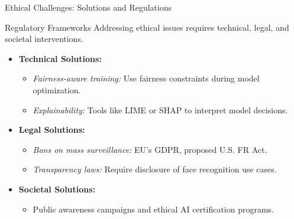 \documentclass[pdfpagelabels=false, usepdftitle=false, aspectratio=169]{beamer}
\begin{document}
\begin{frame}{Ethical Challenges: Solutions and Regulations}
\scriptsize
\begin{block}{{Regulatory Frameworks}}
    Addressing ethical issues requires technical, legal, and societal interventions.
\end{block}
\begin{itemize}
    \item \textbf{Technical Solutions:}
    \begin{itemize}
        \item \textit{Fairness-aware training:} Use fairness constraints during model optimization.
        \item \textit{Explainability:} Tools like LIME or SHAP to interpret model decisions.
    \end{itemize}
    \item \textbf{Legal Solutions:}
    \begin{itemize}
        \item \textit{Bans on mass surveillance:} EU's GDPR, proposed U.S. FR Act.
        \item \textit{Transparency laws:} Require disclosure of face recognition use cases.
    \end{itemize}
    \item \textbf{Societal Solutions:}
    \begin{itemize}
        \item Public awareness campaigns and ethical AI certification programs.
    \end{itemize}
\end{itemize}
\end{frame}
\end{document}
